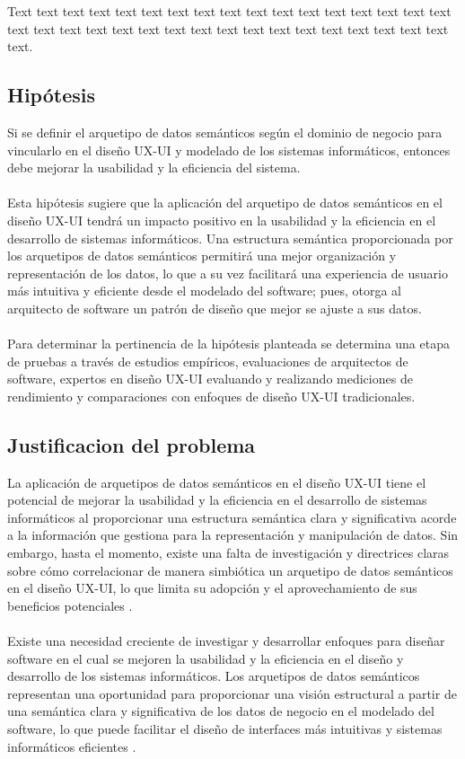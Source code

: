 \documentclass[12pt,a4paper]{article}
\begin{document}
Text text text text text text text text text text text text text text text text text text text text text text text text text text text text text text text text text text text.

\subsection{Hipótesis}
\label{sec:2a}
Si se definir el arquetipo de datos semánticos según el dominio de negocio para vincularlo en el diseño UX-UI y modelado de los sistemas informáticos, entonces debe mejorar la usabilidad y la eficiencia del sistema.
\\\\
Esta hipótesis sugiere que la aplicación del arquetipo de datos semánticos en el diseño UX-UI tendrá un impacto positivo en la usabilidad y la eficiencia en el desarrollo de sistemas informáticos. Una estructura semántica proporcionada por los arquetipos de datos semánticos permitirá una mejor organización y representación de los datos, lo que a su vez facilitará una experiencia de usuario más intuitiva y eficiente desde el modelado del software; pues, otorga al arquitecto de software un patrón de diseño que mejor se ajuste a sus datos. 
\\\\
Para determinar la pertinencia de la hipótesis planteada se determina una etapa de pruebas a través de estudios empíricos, evaluaciones de arquitectos de software, expertos en diseño UX-UI evaluando y realizando mediciones de rendimiento y comparaciones con enfoques de diseño UX-UI tradicionales.

\subsection{Justificacion del problema}
\label{sec:3}
La aplicación de arquetipos de datos semánticos en el diseño UX-UI tiene el potencial de mejorar la usabilidad y la eficiencia en el desarrollo de sistemas informáticos al proporcionar una estructura semántica clara y significativa acorde a la información que gestiona para la representación y manipulación de datos. Sin embargo, hasta el momento, existe una falta de investigación y directrices claras sobre cómo correlacionar de manera simbiótica un arquetipo de datos semánticos en el diseño UX-UI, lo que limita su adopción y el aprovechamiento de sus beneficios potenciales \cite{Garcia2023}.
\\\\
Existe una necesidad creciente de investigar y desarrollar enfoques para diseñar software en el cual se mejoren la usabilidad y la eficiencia en el diseño y desarrollo de los sistemas informáticos. Los arquetipos de datos semánticos representan una oportunidad para proporcionar una visión estructural a partir de una semántica clara y significativa de los datos de negocio en el modelado del software, lo que puede facilitar el diseño de interfaces más intuitivas y sistemas informáticos eficientes \cite{Garcia2023}.
\end{document}
